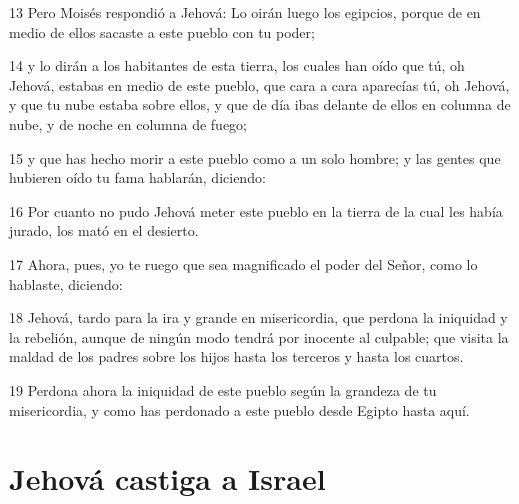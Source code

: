 \par 13 Pero Moisés respondió a Jehová: Lo oirán luego los egipcios, porque de en medio de ellos sacaste a este pueblo con tu poder;
\par 14 y lo dirán a los habitantes de esta tierra, los cuales han oído que tú, oh Jehová, estabas en medio de este pueblo, que cara a cara aparecías tú, oh Jehová, y que tu nube estaba sobre ellos, y que de día ibas delante de ellos en columna de nube, y de noche en columna de fuego;
\par 15 y que has hecho morir a este pueblo como a un solo hombre; y las gentes que hubieren oído tu fama hablarán, diciendo:
\par 16 Por cuanto no pudo Jehová meter este pueblo en la tierra de la cual les había jurado, los mató en el desierto.
\par 17 Ahora, pues, yo te ruego que sea magnificado el poder del Señor, como lo hablaste, diciendo: 
\par 18 Jehová, tardo para la ira y grande en misericordia, que perdona la iniquidad y la rebelión, aunque de ningún modo tendrá por inocente al culpable; que visita la maldad de los padres sobre los hijos hasta los terceros y hasta los cuartos.
\par 19 Perdona ahora la iniquidad de este pueblo según la grandeza de tu misericordia, y como has perdonado a este pueblo desde Egipto hasta aquí. 

\section*{Jehová castiga a Israel }

